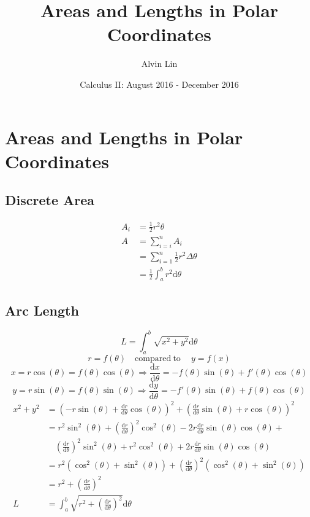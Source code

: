 \documentclass[letterpaper, 12pt]{article}
\title{Areas and Lengths in Polar Coordinates}
\author{Alvin Lin}
\date{Calculus II: August 2016 - December 2016}
\newcommand*{\diff}{\mathrm{d}}
\newcommand*{\ddiff}[2]{\frac{\diff{#1}}{\diff{#2}}}
\begin{document}
\maketitle

\section*{Areas and Lengths in Polar Coordinates}

\subsection*{Discrete Area}
\begin{center}
\end{center}
\begin{align*}
  A_{i} &= \frac{1}{2}r^{2}\theta \\
  A &= \sum_{i=i}^{n}{A_{i}} \\
  &= \sum_{i=1}^{n}{\frac{1}{2}r^{2}\Delta\theta} \\
  &= \frac{1}{2}\int_{a}^{b}{r^{2}\diff{\theta}}
\end{align*}

\subsection*{Arc Length}
\[ L = \int_{a}^{b}{\sqrt{x^{2}+y^{2}}\diff{\theta}} \]
\[ r = f(\theta) \quad \mathrm{compared\ to\ } \quad y=f(x) \]
\[ x = r\cos(\theta) = f(\theta)\cos(\theta) \Longrightarrow
   \ddiff{x}{\theta} = -f(\theta)\sin(\theta)+f'(\theta)\cos(\theta) \]
\[ y = r\sin(\theta) = f(\theta)\sin(\theta) \Longrightarrow
   \ddiff{y}{\theta} = -f'(\theta)\sin(\theta)+f(\theta)\cos(\theta) \]
\begin{align*}
  x^{2}+y^{2} &= (-r\sin(\theta)+\ddiff{r}{\theta}\cos(\theta))^{2}
    +(\ddiff{r}{\theta}\sin(\theta)+r\cos(\theta))^{2} \\
  &= r^{2}\sin^{2}(\theta)+(\ddiff{r}{\theta})^{2}\cos^{2}(\theta)-
    2r\ddiff{r}{\theta}\sin(\theta)\cos(\theta)+ \\
  & \quad (\ddiff{r}{\theta})^{2}\sin^{2}(\theta)+r^{2}\cos^{2}(\theta)+
    2r\ddiff{r}{\theta}\sin(\theta)\cos(\theta) \\
  &= r^{2}(\cos^{2}(\theta)+\sin^{2}(\theta))+
    (\ddiff{r}{\theta})^{2}(\cos^{2}(\theta)+\sin^{2}(\theta)) \\
  &= r^{2}+(\ddiff{r}{\theta})^{2} \\
  L &= \int_{a}^{b}{\sqrt{r^{2}+(\ddiff{r}{\theta})^{2}}\diff{\theta}}
\end{align*}
\end{document}
